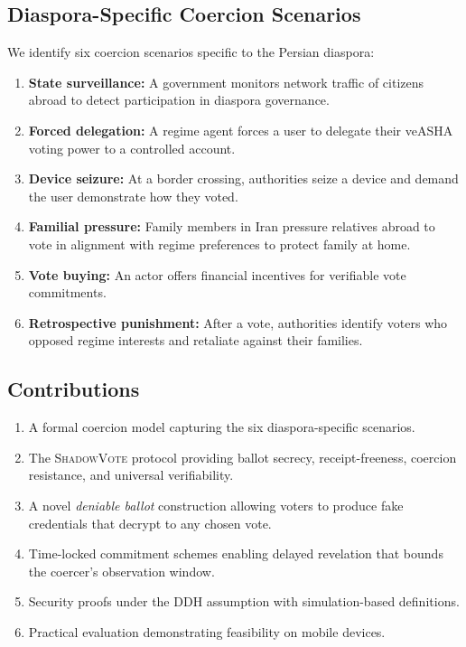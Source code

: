 \documentclass[11pt,a4paper]{article}
\newcommand{\shadow}{\textsc{ShadowVote}\xspace}
\begin{document}
\subsection{Diaspora-Specific Coercion Scenarios}

We identify six coercion scenarios specific to the Persian diaspora:

\begin{enumerate}[label=\textbf{S\arabic*}:]
    \item \textbf{State surveillance:} A government monitors network traffic of citizens abroad to detect participation in diaspora governance.
    \item \textbf{Forced delegation:} A regime agent forces a user to delegate their veASHA voting power to a controlled account.
    \item \textbf{Device seizure:} At a border crossing, authorities seize a device and demand the user demonstrate how they voted.
    \item \textbf{Familial pressure:} Family members in Iran pressure relatives abroad to vote in alignment with regime preferences to protect family at home.
    \item \textbf{Vote buying:} An actor offers financial incentives for verifiable vote commitments.
    \item \textbf{Retrospective punishment:} After a vote, authorities identify voters who opposed regime interests and retaliate against their families.
\end{enumerate}

\subsection{Contributions}

\begin{enumerate}[label=(\roman*)]
    \item A formal coercion model capturing the six diaspora-specific scenarios.
    \item The \shadow protocol providing ballot secrecy, receipt-freeness, coercion resistance, and universal verifiability.
    \item A novel \emph{deniable ballot} construction allowing voters to produce fake credentials that decrypt to any chosen vote.
    \item Time-locked commitment schemes enabling delayed revelation that bounds the coercer's observation window.
    \item Security proofs under the DDH assumption with simulation-based definitions.
    \item Practical evaluation demonstrating feasibility on mobile devices.
\end{enumerate}
\end{document}
